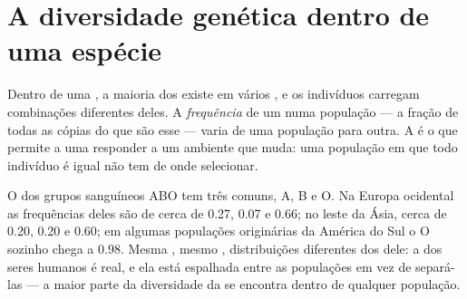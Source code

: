 \section{A diversidade genética dentro de uma espécie}

\begin{proposition}\label{prop:g10:biodiversity-scales:genetic}
Dentro de uma , a maioria dos  existe em vários , e
os indivíduos carregam combinações diferentes deles. A
\emph{frequência} de um  numa população --- a fração de todas as
cópias do  que são esse  --- varia de uma população para
outra. A  é o que permite a uma  responder a
um ambiente que muda: uma população em que todo indivíduo é igual não
tem de onde selecionar.
\end{proposition}
\admitted

\begin{example}\label{ex:g10:biodiversity-scales:abo}
O  dos grupos sanguíneos ABO tem três  comuns, A, B e O. Na
Europa ocidental as frequências deles são de cerca de 0.27, 0.07 e
0.66; no leste da Ásia, cerca de 0.20, 0.20 e 0.60; em algumas
populações originárias da América do Sul o  O sozinho chega a
0.98. Mesma , mesmo , distribuições diferentes dos 
dele: a  dos seres humanos é real, e ela está
espalhada entre as populações em vez de separá-las --- a maior parte da
diversidade da  se encontra dentro de qualquer população.
\end{example}

